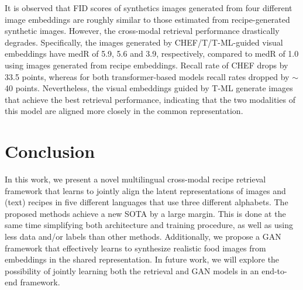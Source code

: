 \documentclass[sigconf,nonacm]{acmart}
\begin{document}
It is observed that FID scores of synthetics images generated from four different image embeddings are roughly similar to those estimated from recipe-generated synthetic images. However, the cross-modal retrieval performance drastically degrades. Specifically, the images generated by CHEF/T/T-ML-guided visual embeddings have medR of 5.9, 5.6 and 3.9, respectively, compared to medR of 1.0 using images generated from recipe embeddings. Recall rate of CHEF drops by 33.5 points, whereas for both transformer-based models recall rates dropped by $\sim$40 points. Nevertheless, the visual embeddings guided by T-ML generate images that achieve the best retrieval performance, indicating that the two modalities of this model are aligned more closely in the common representation.

\section{Conclusion}

In this work, we present a novel multilingual cross-modal recipe retrieval framework that learns to jointly align the latent representations of images and (text) recipes in five different languages that use three different alphabets. The proposed methods achieve a new SOTA by a large margin. This is done at the same time simplifying both architecture and training procedure, as well as using less data and/or labels than other methods. Additionally, we propose a GAN framework that effectively learns to synthesize realistic food images from embeddings in the shared representation. In future work, we will explore the possibility of jointly learning both the retrieval and GAN models in an end-to-end framework.













\onecolumn
\section*{}
\vspace{3em}
\end{document}

